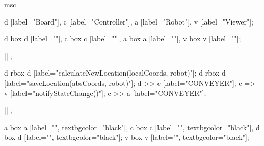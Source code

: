 \begin{msc}
msc
{

d [label="Board"],
c [label="Controller"],
a [label="Robot"],
v [label="Viewer"];

d box d [label=""],
c box c [label=""],
a box a [label=""],
v box v [label=""];

|||;

d rbox d [label="calculateNewLocation(localCoords, robot)"];
d rbox d [label="saveLocation(absCoords, robot)"];
d >> c [label="CONVEYER"];
c => v [label="notifyStateChange()"];
c >> a [label="CONVEYER"];

|||;

a box a [label="", textbgcolor="black"],
c box c [label="", textbgcolor="black"],
d box d [label="", textbgcolor="black"];
v box v [label="", textbgcolor="black"];

}
\end{msc}
